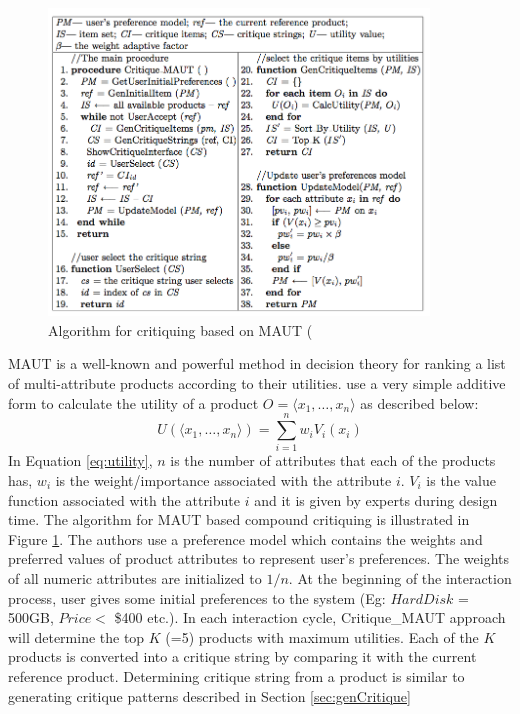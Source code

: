 \begin{figure}
  \centering
    \includegraphics[width=0.9\textwidth]{figures-bharath/paperAlgo.png}
  \caption{Algorithm for critiquing based on MAUT (\cite{mautPaper}}
\label{fig:paperAlgo}
\end{figure}

MAUT is a well-known  and powerful method in decision theory for ranking a list of multi-attribute products according to their utilities.
\cite{mautPaper} use a very simple additive form to calculate the utility of a product $O = \langle x_1,\hdots,x_n\rangle$ as described below:
\begin{equation}
\label{eq:utility}
U(\langle x_1,\hdots,x_n \rangle) = \sum_{i=1}^n w_iV_i(x_i)
\end{equation}
%
In Equation \ref{eq:utility}, $n$ is the number of attributes that each of the products has, $w_i$ is the weight/importance associated with the attribute $i$. 
$V_i$ is the value function associated with the attribute $i$ and it is given by experts during design time.
The algorithm for MAUT based compound critiquing is illustrated in Figure \ref{fig:paperAlgo}.
The authors use a preference model which contains the weights and preferred values of product attributes to represent user's preferences.
The weights of all numeric attributes are initialized to $1/n$.
At the beginning of the interaction process, user gives some initial preferences to the system (Eg: $HardDisk$ = 500GB, $Price <$ \$400 etc.).
In each interaction cycle, Critique\_MAUT approach will determine the top $K$ (=5) products with maximum utilities.
Each of the $K$ products is converted into a critique string by comparing it with the current reference product.
Determining critique string from a product is similar to generating critique patterns described in Section \ref{sec:genCritique}


